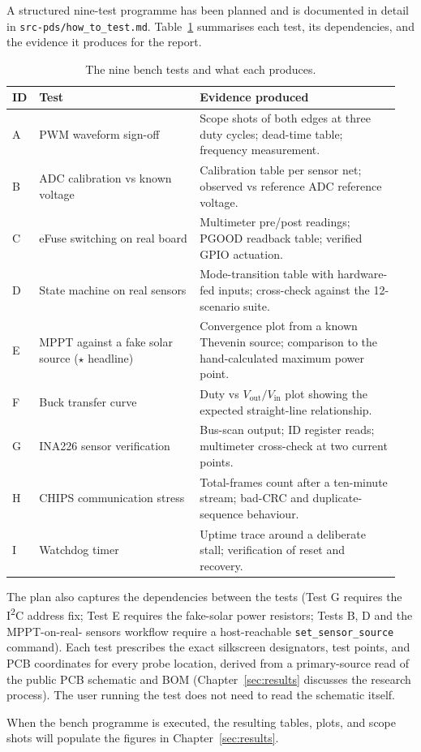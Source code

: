 A structured nine-test programme has been planned and is
documented in detail in \texttt{src-pds/how\_to\_test.md}.
Table~\ref{tab:bench-tests} summarises each test, its
dependencies, and the evidence it produces for the report.

\begin{table}[ht]
\centering
\caption{The nine bench tests and what each produces.}
\label{tab:bench-tests}
\small
\begin{tabular}{@{}p{0.05\linewidth}p{0.4\linewidth}p{0.5\linewidth}@{}}
\toprule
\textbf{ID} & \textbf{Test} & \textbf{Evidence produced} \\
\midrule
A & PWM waveform sign-off & Scope shots of both edges at three
duty cycles; dead-time table; frequency measurement. \\
B & ADC calibration vs known voltage & Calibration table per
sensor net; observed vs reference ADC reference voltage. \\
C & eFuse switching on real board & Multimeter pre/post
readings; PGOOD readback table; verified GPIO actuation. \\
D & State machine on real sensors & Mode-transition table with
hardware-fed inputs; cross-check against the 12-scenario suite. \\
E & MPPT against a fake solar source ($\star$ headline) &
Convergence plot from a known Thevenin source; comparison to the
hand-calculated maximum power point. \\
F & Buck transfer curve & Duty vs $V_{\text{out}}/V_{\text{in}}$
plot showing the expected straight-line relationship. \\
G & INA226 sensor verification & Bus-scan output; ID
register reads; multimeter cross-check at two current points. \\
H & CHIPS communication stress & Total-frames count after a
ten-minute stream; bad-CRC and duplicate-sequence behaviour. \\
I & Watchdog timer & Uptime trace around a deliberate stall;
verification of reset and recovery. \\
\bottomrule
\end{tabular}
\end{table}

The plan also captures the dependencies between the tests (Test G
requires the I\textsuperscript{2}C address fix; Test E requires
the fake-solar power resistors; Tests B, D and the MPPT-on-real-
sensors workflow require a host-reachable
\texttt{set\_sensor\_source} command). Each test prescribes the
exact silkscreen designators, test points, and PCB coordinates
for every probe location, derived from a primary-source read of
the public PCB schematic and BOM (Chapter~\ref{sec:results}
discusses the research process). The user running the test does
not need to read the schematic itself.

When the bench programme is executed, the resulting tables,
plots, and scope shots will populate the figures in
Chapter~\ref{sec:results}.
